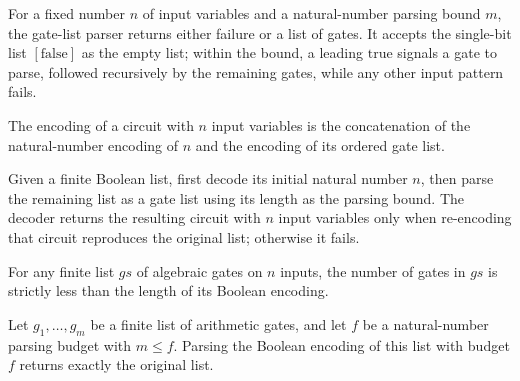 \begin{definition}
\label{Randomized.AlgCircuit.parseGates}
\leanok
{}
For a fixed number $n$ of input variables and a natural-number parsing bound $m$, the
gate-list parser returns either failure or a list of gates. It accepts the single-bit
list $[\mathrm{false}]$ as the empty list; within the bound, a leading $\mathrm{true}$
signals a gate to parse, followed recursively by the remaining gates, while any other
input pattern fails.
\end{definition}

\begin{definition}
\label{Randomized.AlgCircuit.encode}
\leanok
{}
The encoding of a circuit with $n$ input variables is the concatenation of the
natural-number encoding of $n$ and the encoding of its ordered gate list.
\end{definition}

\begin{definition}
\label{Randomized.AlgCircuit.decode}
\leanok
{}
Given a finite Boolean list, first decode its initial natural number $n$, then parse the
remaining list as a gate list using its length as the parsing bound. The decoder returns
the resulting circuit with $n$ input variables only when re-encoding that circuit
reproduces the original list; otherwise it fails.
\end{definition}

\begin{theorem}
\label{Randomized.AlgCircuit.length_encodeGates}
\leanok
{}
For any finite list $gs$ of algebraic gates on $n$ inputs, the number of gates in $gs$
is strictly less than the length of its Boolean encoding.
\end{theorem}

\begin{theorem}
\label{Randomized.AlgCircuit.parseGates_encodeGates}
\leanok
{}
Let $g_1,\ldots,g_m$ be a finite list of arithmetic gates, and let $f$ be a
natural-number parsing budget with $m\le f$. Parsing the Boolean encoding of this list
with budget $f$ returns exactly the original list.
\end{theorem}

